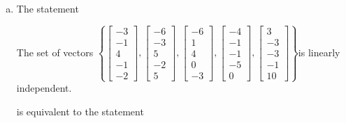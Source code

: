\begin{exerciseAnswer}
\begin{enumerate}[(a)]
\item The statement 
\begin{center}\begin{minipage}{0.8\textwidth}
 The set of vectors \( \left\{ \left[\begin{array}{c}
-3 \\
-1 \\
4 \\
-1 \\
-2
\end{array}\right] , \left[\begin{array}{c}
-6 \\
-3 \\
5 \\
-2 \\
5
\end{array}\right] , \left[\begin{array}{c}
-6 \\
1 \\
4 \\
0 \\
-3
\end{array}\right] , \left[\begin{array}{c}
-4 \\
-1 \\
-1 \\
-5 \\
0
\end{array}\right] , \left[\begin{array}{c}
3 \\
-3 \\
-3 \\
-1 \\
10
\end{array}\right] \right\} \)is linearly independent.
\end{minipage}\end{center}
     is equivalent to the statement 
\begin{center}\begin{minipage}{0.8\textwidth}
 The vector equation \( x_{1} \left[\begin{array}{c}
-3 \\
-1 \\
4 \\
-1 \\
-2
\end{array}\right] + x_{2} \left[\begin{array}{c}
-6 \\
-3 \\

\end{array}
\end{minipage}
\end{center}
\end{enumerate}
\end{exerciseAnswer}
